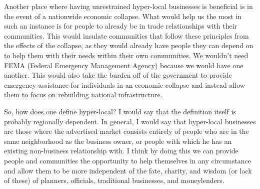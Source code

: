 Another place where having unrestrained hyper-local businesses is
beneficial is in the event of a nationwide economic collapse. What
would help us the most in such an
instance is for people to already be in trade relationships with their
communities.  This would insulate
communities that follow these principles from the effects
of the collapse, as they would already
have people they can depend on to help them with
their needs within their own communities. We
wouldn’t need FEMA (Federal Emergency Management Agency) because we
would have one another. This would
also take the burden off of the government to provide emergency
assistance for individuals in an economic collapse and instead allow
them to focus on rebuilding national
infrastructure.

So, how does one define hyper-local?  I would say that the definition
itself is probably regionally dependent. In general, I would say
that hyper-local businesses are those
where the advertised market consists entirely of people who are in the
same neighborhood as the business owner, or people with which he has an
existing non-business relationship with. I think by doing this we can
provide people and communities the opportunity to help themselves in
any circumstance and allow them to be more independent of the fate,
charity, and wisdom (or lack of these) of planners, officials,
traditional businesses, and moneylenders.
